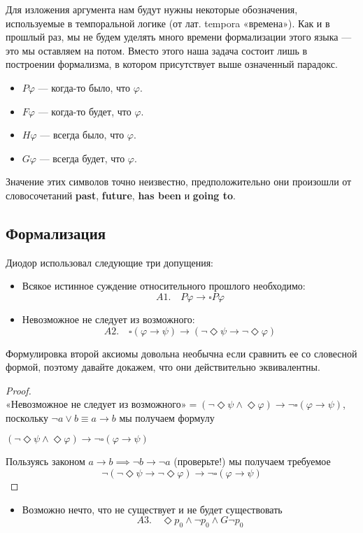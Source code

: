 \documentclass[openany]{book}
\theoremstyle{plain}
\theoremstyle{definition}
\begin{document}
Для изложения аргумента нам будут нужны некоторые обозначения, используемые в темпоральной логике (от лат. tempora «времена»). Как и в прошлый раз, мы не будем уделять много времени формализации этого языка — это мы оставляем на потом. Вместо этого наша задача состоит лишь в построении формализма, в котором присутствует выше означенный парадокс.

\begin{itemize}
\item \(P\varphi\) — когда-то было, что \(\varphi\).
\item \(F\varphi\) — когда-то будет, что \(\varphi\).
\item \(H\varphi\) — всегда было, что \(\varphi\).
\item \(G\varphi\) — всегда будет, что \(\varphi\).
\end{itemize}

Значение этих символов точно неизвестно, предположительно они произошли от словосочетаний \textbf{past}, \textbf{future}, \textbf{has been} и \textbf{going to}. 

\subsection{Формализация}

Диодор использовал следующие три допущения:

\begin{itemize}
\item Всякое истинное суждение относительного прошлого необходимо:
    \[A1. \quad P\varphi \to \square P\varphi \]
\item Невозможное не следует из возможного:
    \[A2. \quad \square(\varphi \to \psi) \to (\neg \Diamond \psi \to \neg \Diamond \varphi)\]
\end{itemize}

Формулировка второй аксиомы довольна необычна если сравнить ее со словесной формой, поэтому давайте докажем, что они действительно эквивалентны.
\begin{proof}

\(\text{«Невозможное не следует из возможного»} = (\neg \Diamond \psi \land \Diamond \varphi) \to \neg \square (\varphi \to \psi)\), поскольку \(\neg a \lor b \equiv a \to b\) мы получаем формулу

\((\neg \Diamond \psi \land \Diamond \varphi) \to \neg \square (\varphi \to \psi)\)

Пользуясь законом \(a \to b \implies \neg b \to \neg a\) (проверьте!) мы получаем требуемое
$$\neg(\neg \Diamond \psi \to \neg \Diamond \varphi) \to \neg \square (\varphi \to \psi)$$
\end{proof}
\begin{itemize}
\item Возможно нечто, что не существует и не будет существовать
    \[A3. \quad \Diamond p_0 \land \neg p_0 \land G\neg p_0\]
 \end{itemize}
\end{document}
